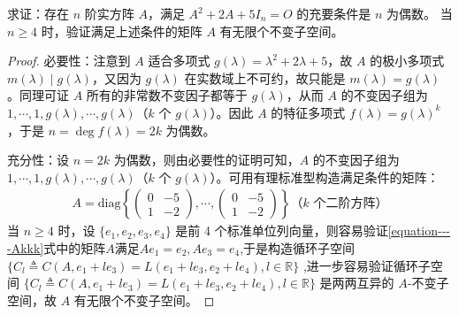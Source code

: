 \documentclass[../../main.tex]{subfiles}%
\begin{document}
\begin{example}
求证：存在 $n$ 阶实方阵 $A$，满足 $A^2 + 2A + 5I_n = O$ 的充要条件是 $n$ 为偶数。
当 $n\geqslant  4$ 时，验证满足上述条件的矩阵 $A$ 有无限个不变子空间。
\end{example}
\begin{proof}

{\heiti 必要性：}注意到 $A$ 适合多项式 $g(\lambda)=\lambda^2 + 2\lambda + 5$，故 $A$ 的极小多项式 $m(\lambda)\mid g(\lambda)$，又因为 $g(\lambda)$ 在实数域上不可约，故只能是 $m(\lambda)=g(\lambda)$。同理可证 $A$ 所有的非常数不变因子都等于 $g(\lambda)$，从而 $A$ 的不变因子组为 $1,\cdots,1,g(\lambda),\cdots,g(\lambda)$（$k$ 个 $g(\lambda)$）。因此 $A$ 的特征多项式 $f(\lambda)=g(\lambda)^k$，于是 $n = \deg f(\lambda)=2k$ 为偶数。

{\heiti 充分性：}设 $n = 2k$ 为偶数，则由必要性的证明可知，$A$ 的不变因子组为 $1,\cdots,1,g(\lambda),\cdots,g(\lambda)$（$k$ 个 $g(\lambda)$）。可用有理标准型构造满足条件的矩阵：
\begin{align}\label{equation----Akkk}
A=\mathrm{diag}\left\{\begin{pmatrix}
0 & -5 \\
1 & -2
\end{pmatrix},\cdots,\begin{pmatrix}
0 & -5 \\
1 & -2
\end{pmatrix}\right\} \text{（$k$ 个二阶方阵）}
\end{align}
当 $n\geqslant  4$ 时，设 $\{e_1,e_2,e_3,e_4\}$ 是前 4 个标准单位列向量，则容易验证\eqref{equation----Akkk}式中的矩阵$A$满足$Ae_1=e_2,Ae_3=e_4$,于是构造循环子空间 $\{C_l \triangleq  C(A,e_1 + le_3)=L(e_1 + le_3,e_2 + le_4),l\in\mathbb{R}\}$ ,进一步容易验证循环子空间 $\{C_l \triangleq  C(A,e_1 + le_3)=L(e_1 + le_3,e_2 + le_4),l\in\mathbb{R}\}$ 是两两互异的 $A$-不变子空间，故 $A$ 有无限个不变子空间。
\end{proof}
\end{document}
